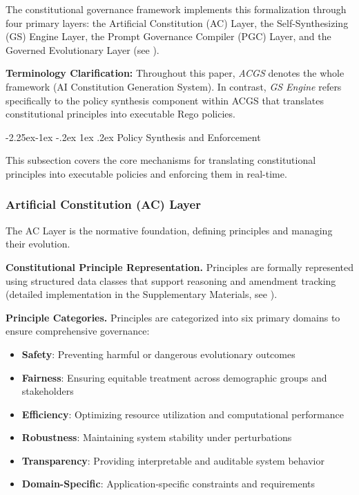 \documentclass[manuscript,screen,review,anonymous,9pt]{acmart}
\makeatletter
\renewcommand\subsection{\@startsection{subsection}{2}{\z@}%
  {-2.25ex\@plus -1ex \@minus -.2ex}%
  {1ex \@plus .2ex}%
  {\normalfont\large\bfseries}}
\makeatother
\begin{document}
The constitutional governance framework implements this formalization through four primary layers: the Artificial Constitution (AC) Layer, the Self-Synthesizing (GS) Engine Layer, the Prompt Governance Compiler (PGC) Layer, and the Governed Evolutionary Layer (see ).

\textbf{Terminology Clarification:} Throughout this paper, \textit{ACGS} denotes the whole framework (AI Constitution Generation System). In contrast, \textit{GS Engine} refers specifically to the policy synthesis component within ACGS that translates constitutional principles into executable Rego policies.

\subsection{Policy Synthesis and Enforcement}
\label{subsec:policy_synthesis_enforcement}

This subsection covers the core mechanisms for translating constitutional principles into executable policies and enforcing them in real-time.

\subsubsection{Artificial Constitution (AC) Layer}
The AC Layer is the normative foundation, defining principles and managing their evolution.

\textbf{Constitutional Principle Representation.} Principles are formally represented using structured data classes that support reasoning and amendment tracking (detailed implementation in the Supplementary Materials, see ).

\textbf{Principle Categories.} Principles are categorized into six primary domains to ensure comprehensive governance:

\begin{itemize}
	\item \textbf{Safety}: Preventing harmful or dangerous evolutionary outcomes
	\item \textbf{Fairness}: Ensuring equitable treatment across demographic groups and stakeholders
	\item \textbf{Efficiency}: Optimizing resource utilization and computational performance
	\item \textbf{Robustness}: Maintaining system stability under perturbations
	\item \textbf{Transparency}: Providing interpretable and auditable system behavior
	\item \textbf{Domain-Specific}: Application-specific constraints and requirements
\end{itemize}
\end{document}
